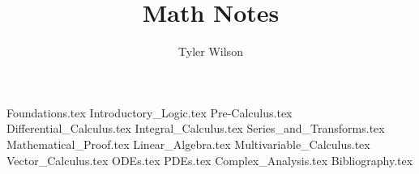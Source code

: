 \documentclass[11pt, fleqn]{article}
\title{Math Notes}
\author{Tyler Wilson}
\date{}
\begin{document}
\allowdisplaybreaks

\maketitle
\tableofcontents

{Foundations.tex}
{Introductory_Logic.tex}
{Pre-Calculus.tex}
{Differential_Calculus.tex}
{Integral_Calculus.tex}
{Series_and_Transforms.tex}
{Mathematical_Proof.tex}
{Linear_Algebra.tex}
{Multivariable_Calculus.tex}
{Vector_Calculus.tex}
{ODEs.tex}
{PDEs.tex}
{Complex_Analysis.tex}
{Bibliography.tex}
\end{document}
